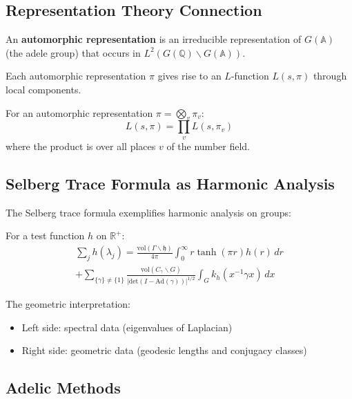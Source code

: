 \subsection{Representation Theory Connection}

\begin{definition}
An \textbf{automorphic representation} is an irreducible representation of $G(\mathbb{A})$ (the adele group) that occurs in $L^2(G(\mathbb{Q}) \backslash G(\mathbb{A}))$.
\end{definition}

Each automorphic representation $\pi$ gives rise to an $L$-function $L(s,\pi)$ through local components.

\begin{theorem}
For an automorphic representation $\pi = \bigotimes_v \pi_v$:
$$L(s,\pi) = \prod_v L(s,\pi_v)$$
where the product is over all places $v$ of the number field.
\end{theorem}

\subsection{Selberg Trace Formula as Harmonic Analysis}

The Selberg trace formula exemplifies harmonic analysis on groups:

\begin{theorem}
For a test function $h$ on $\mathbb{R}^+$:
\begin{multline}
\sum_{j} h(\lambda_j) = \frac{\text{vol}(\Gamma \backslash \mathfrak{h})}{4\pi} \int_0^{\infty} r \tanh(\pi r) h(r) \, dr \\
+ \sum_{\{\gamma\} \neq \{1\}} \frac{\text{vol}(C_{\gamma} \backslash G)}{|\text{det}(I - \text{Ad}(\gamma))|^{1/2}} \int_G k_h(x^{-1}\gamma x) \, dx
\end{multline}
\end{theorem}

The geometric interpretation:
\begin{itemize}
\item Left side: spectral data (eigenvalues of Laplacian)
\item Right side: geometric data (geodesic lengths and conjugacy classes)
\end{itemize}

\subsection{Adelic Methods}

